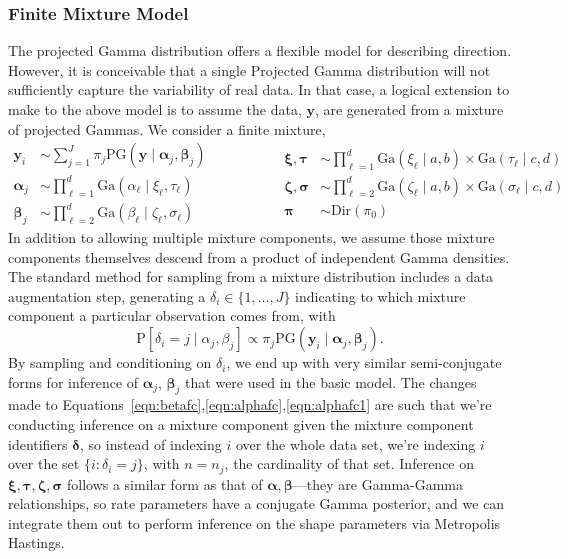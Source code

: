 \subsubsection{Finite Mixture Model}
The projected Gamma distribution offers a flexible model for describing direction.  However, it is
  conceivable that a single Projected Gamma distribution will not sufficiently capture the
  variability of real data.  In that case, a logical extension to make to the above model is to
  assume the data, $\bm{ y}$, are generated from a mixture of projected Gammas.  We consider a finite
  mixture,
  \begin{equation}
    \label{eqn:fmixp}
    \begin{aligned}
      \bm{ y}_i &\sim \sum_{j = 1}^J\pi_j\text{PG}\left(\bm{ y}\mid \bm{ \alpha}_j, \bm{ \beta}_j\right)\\
      \bm{ \alpha}_j &\sim {\textstyle \prod}_{\ell = 1}^d \text{Ga}\left(\alpha_{\ell}\mid\xi_{\ell},\tau_{\ell}\right)\\
      \bm{ \beta}_j &\sim {\textstyle \prod}_{\ell = 2}^d \text{Ga}\left(\beta_{\ell}\mid\zeta_{\ell},\sigma_{\ell}\right)
    \end{aligned}
    \hspace{2cm}
    \begin{aligned}
      \bm{ \xi},\bm{\tau} &\sim {\textstyle \prod}_{\ell = 1}^d \text{Ga}(\xi_{\ell}\mid a,b) \times \text{Ga}(\tau_{\ell}\mid c,d)\\
      \bm{ \zeta},\bm{\sigma} &\sim {\textstyle\prod}_{\ell = 2}^d\text{Ga}(\zeta_{\ell} \mid a,b)\times \text{Ga}(\sigma_{\ell}\mid c,d)\\
      \bm{ \pi} &\sim \text{Dir}(\pi_0)
    \end{aligned}
  \end{equation}
  In addition to allowing multiple mixture components, we assume those mixture components themselves
  descend from a product of independent Gamma densities. The standard method for sampling from a
  mixture distribution includes a data augmentation step, generating a
  $\delta_i \in \lbrace 1,\ldots, J\rbrace$ indicating to which mixture component a
  particular observation comes from, with
  \begin{equation*}
    \text{P}\left[\delta_i = j\mid\alpha_j,\beta_j\right] \propto \pi_j\text{PG}\left(\bm{ y}_i\mid \bm{ \alpha}_j,\bm{ \beta}_j\right).
  \end{equation*}
  By sampling and conditioning on $\delta_i$, we end up with very similar semi-conjugate forms for
  inference of $\bm{ \alpha}_j$, $\bm{ \beta}_j$ that were used in the basic model.  The changes made
  to Equations~\ref{eqn:betafc},\ref{eqn:alphafc},\ref{eqn:alphafc1} are such that we're conducting inference
  on a mixture component given the mixture component identifiers $\bm{ \delta}$, so instead of indexing
  $i$ over the whole data set, we're indexing $i$ over the set $\{i :\delta_i = j\}$, with $n = n_j$,
  the cardinality of that set. Inference on $\bm{ \xi,\tau,\zeta,\sigma}$ follows a similar form as
  that of $\bm{ \alpha,\beta}$---they are Gamma-Gamma relationships, so rate parameters have a conjugate
  Gamma posterior, and we can integrate them out to perform inference on the shape parameters via
  Metropolis Hastings.

